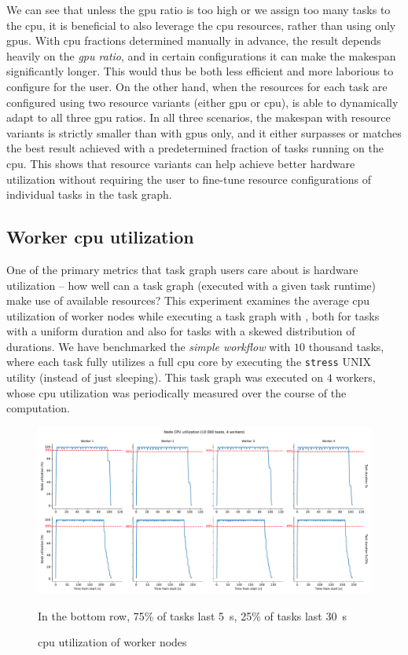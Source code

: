 We can see that unless the \gls{gpu} ratio is too high or we assign too many tasks to
the \gls{cpu}, it is beneficial to also leverage the \gls{cpu}
resources, rather than using only \glspl{gpu}. With \gls{cpu} fractions
determined manually in advance, the result depends heavily on the \emph{\gls{gpu} ratio}, and in
certain configurations it can make the makespan significantly longer. This would thus be both less
efficient and more laborious to configure for the user. On the other hand, when the resources for
each task are configured using two resource variants (either \gls{gpu} or
\gls{cpu}), \hyperqueue{} is able to dynamically adapt to all three
\gls{gpu} ratios. In all three scenarios, the makespan with resource variants is
strictly smaller than with \glspl{gpu} only, and it either surpasses or matches the
best result achieved with a predetermined fraction of tasks running on the \gls{cpu}.
This shows that resource variants can help achieve better hardware utilization without requiring
the user to fine-tune resource configurations of individual tasks in the task graph.

\subsection{Worker \gls{cpu} utilization}
\label{sec:hq-cpu-utilization}
One of the primary metrics that task graph users care about is hardware utilization -- how well can
a task graph (executed with a given task runtime) make use of available resources? This experiment
examines the average \gls{cpu} utilization of worker nodes while executing a task
graph with \hyperqueue{}, both for tasks with a uniform duration and also for tasks with
a skewed distribution of durations. We have benchmarked the \emph{simple workflow} with
$10$ thousand tasks, where each task fully utilizes a full
\gls{cpu} core by executing the \texttt{stress} UNIX utility (instead of just
sleeping). This task graph was executed on $4$ workers, whose
\gls{cpu} utilization was periodically measured over the course of the computation.

\begin{figure}[h]
	\centering
	\includegraphics[width=\textwidth]{imgs/hq/charts/scalability-stress-utilization}

	In the bottom row, 75\% of tasks last \SI{5}{\second}, 25\% of tasks last
	\SI{30}{\second} \caption{\gls{cpu} utilization of \hyperqueue{} worker nodes} \label{fig:hq-cpu-utilization}
\end{figure}

